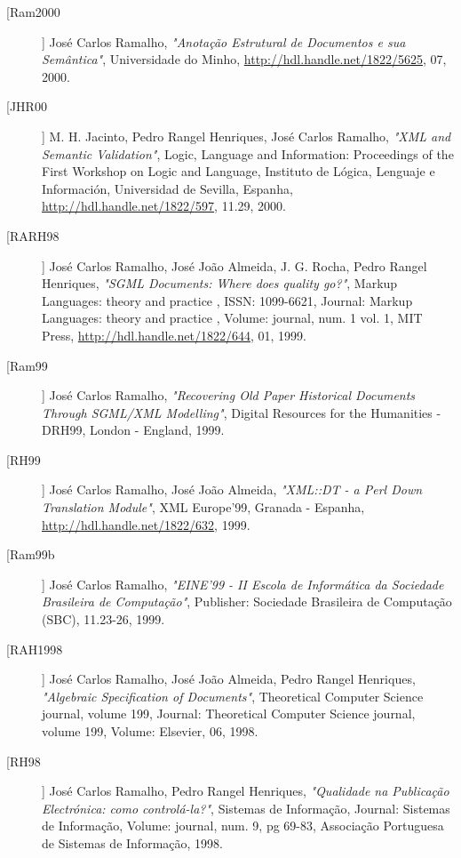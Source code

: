 \begin{description}
\item[[Ram2000]]
    \textsf{José Carlos Ramalho}, \emph{"Anotação Estrutural de Documentos e sua Semântica"}, Universidade do Minho, \url{http://hdl.handle.net/1822/5625}, 07, 2000.

\item[[JHR00]]
    \textsf{M. H.  Jacinto, Pedro Rangel Henriques, José Carlos Ramalho}, \emph{"XML and Semantic Validation"}, Logic, Language and Information: Proceedings of the First Workshop on Logic and Language, Instituto de Lógica, Lenguaje e Información, Universidad de Sevilla, Espanha, \url{http://hdl.handle.net/1822/597}, 11.29, 2000.

\item[[RARH98]]
    \textsf{José Carlos Ramalho, José João Almeida, J. G. Rocha, Pedro Rangel Henriques}, \emph{"SGML Documents: Where does quality go?"}, Markup Languages: theory and practice , ISSN: 1099-6621, Journal: Markup Languages: theory and practice , Volume: journal, num. 1 vol. 1, MIT Press, \url{http://hdl.handle.net/1822/644}, 01, 1999.

\item[[Ram99]]
    \textsf{José Carlos Ramalho}, \emph{"Recovering Old Paper Historical Documents Through SGML/XML Modelling"}, Digital Resources for the Humanities - DRH99, London - England, 1999.

\item[[RH99]]
    \textsf{José Carlos Ramalho, José João Almeida}, \emph{"XML::DT - a Perl Down Translation Module"}, XML Europe'99, Granada - Espanha, \url{http://hdl.handle.net/1822/632}, 1999.

\item[[Ram99b]]
    \textsf{José Carlos Ramalho}, \emph{"EINE'99 - II Escola de Informática da Sociedade Brasileira de Computação"}, Publisher: Sociedade Brasileira de Computação (SBC), 11.23-26, 1999.

\item[[RAH1998]]
    \textsf{José Carlos Ramalho, José João Almeida, Pedro Rangel Henriques}, \emph{"Algebraic Specification of Documents"}, Theoretical Computer Science journal, volume 199, Journal: Theoretical Computer Science journal, volume 199, Volume: Elsevier, 06, 1998.

\item[[RH98]]
    \textsf{José Carlos Ramalho, Pedro Rangel Henriques}, \emph{"Qualidade na Publicação Electrónica: como controlá-la?"}, Sistemas de Informação, Journal: Sistemas de Informação, Volume: journal, num. 9, pg 69-83, Associação Portuguesa de Sistemas de Informação, 1998.


\end{description}
